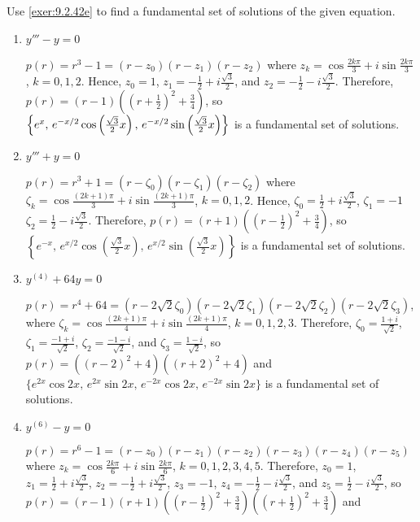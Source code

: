 \documentclass{ximera}
\begin{document}
\begin{problem}\label{exer:9.2.43}
Use \ref{exer:9.2.42e} to find a fundamental set of
solutions of the given equation.

\begin{enumerate}
\item $y'''-y=0$

\begin{solution}
$p(r)=r^3-1=(r-z_0)(r-z_1)(r-z_2)$ where
$z_k=\cos\frac{2k\pi}{3}+i\sin\frac{2k\pi}{3}$, $k=0,1,2$. Hence,
$z_0=1$, $z_1=-\frac{1}{2}+i\frac{\sqrt3}{2}$, and
$z_2=-\frac{1}{2}-i\frac{\sqrt3}{2}$. Therefore,
$p(r)=(r-1)\left(\left(r+\frac{1}{2}\right)^2+\frac{3}{4}\right)$,
so
$\left\{e^x,\,e^{-x/2}\cos\left(\frac{\sqrt3}{2}x\right),
\,e^{-x/2}\sin\left({\sqrt3\over2}x\right)\right\}$
is a fundamental set of solutions.
\end{solution}

\item $y'''+y=0$

\begin{solution}
$p(r)=r^3+1=(r-\zeta_0)(r-\zeta_1)(r-\zeta_2)$ where
$\zeta_k=\cos\frac{(2k+1)\pi}{3}+i\sin\frac{(2k+1)\pi}{3}$, $k=0,1,2$.
Hence,
 $\zeta_0=\frac{1}{2}+i\frac{\sqrt3}{2}$, $\zeta_1=-1$
$\zeta_2=\frac{1}{2}-i\frac{\sqrt3}{2}$. Therefore,
$p(r)=(r+1)\left(\left(r-\frac{1}{2}\right)^2+\frac{3}{4}\right)$,
so
 $\left\{e^{-x},\,e^{x/2}\cos\left(\frac{\sqrt3}{2}x\right),
\,e^{x/2}\sin\left(\frac{\sqrt3}{2}x\right)\right\}$
is a fundamental set of solutions.
\end{solution}

\item $y^{(4)}+64y=0$

\begin{solution}
$p(r)=r^4+64=(r-2\sqrt2\zeta_0)(r-2\sqrt2\zeta_1)
(r-2\sqrt2\zeta_2)(r-2\sqrt2\zeta_3)$,
where
$\zeta_k=\cos\frac{(2k+1)\pi}{4}+i\sin\frac{(2k+1)\pi}{4}$,
$k=0,1,2,3$. Therefore,
$\zeta_0=\frac{1+i}{\sqrt2}$,
$\zeta_1=\frac{-1+i}{\sqrt2}$,
$\zeta_2=\frac{-1-i}{\sqrt2}$,
and $\zeta_3=\frac{1-i}{\sqrt2}$, so
 $p(r)=((r-2)^2+4)((r+2)^2+4)$ and
$\{e^{2x}\cos2x,\,e^{2x}\sin2x,\,e^{-2x}\cos2x,\,e^{-2x}\sin2x\}$
is a fundamental set of solutions.
\end{solution}

\item $y^{(6)}-y=0$\label{exer:9.2.43d}

\begin{solution}
$p(r)=r^6-1=(r-z_0)(r-z_1)(r-z_2)(r-z_3)(r-z_4)(r-z_5)$ where
$z_k=\cos\frac{2k\pi}{6}+i\sin\frac{2k\pi}{6}$,
$k=0,1,2,3,4,5$. Therefore,
$z_0=1$,
$z_1=\frac{1}{2}+i\frac{\sqrt3}{2}$,
$z_2=-\frac{1}{2}+i\frac{\sqrt3}{2}$,
$z_3=-1$,
$z_4=-\frac{1}{2}-i\frac{\sqrt3}{2}$,
and $z_5=\frac{1}{2}-i\frac{\sqrt3}{2}$, so
$p(r)=(r-1)(r+1)\left(\left(r-\frac{1}{2}\right)^2+\frac{3}{4}\right)
\left(\left(r+\frac{1}{2}\right)^2+\frac{3}{4}\right)$ and


\end{solution}
\end{enumerate}
\end{problem}
\end{document}
